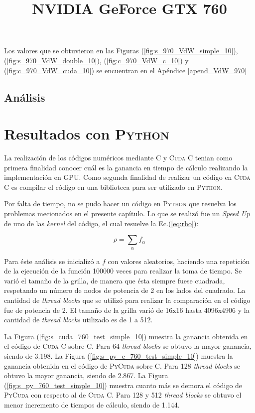 Los valores que se obtuvieron en las Figuras (\ref{fig:s_970_VdW_simple_10}), (\ref{fig:s_970_VdW_double_10}), (\ref{fig:c_970_VdW_c_10}) y (\ref{fig:c_970_VdW_cuda_10}) se encuentran en el Apéndice \ref{apend_VdW_970}

\subsection{Análisis}


\section{Resultados con \textsc{Python}}

La realización de los códigos numéricos mediante \textsc{C} y \textsc{Cuda C} tenian como primera finalidad conocer cuál es la ganancia en tiempo de cálculo realizando la implementación en GPU. Como segunda finalidad de realizar un código en \textsc{Cuda C} es compilar el código en una biblioteca para ser utilizado en \textsc{Python}.

Por falta de tiempo, no se pudo hacer un código en \textsc{Python} que resuelva los problemas mecionados en el presente capítulo. Lo que se realizó fue un \textit{Speed Up} 
de uno de las \textit{kernel} del código, el cual resuelve la Ec.(\ref{eq:rho}):

\begin{equation*}
\rho = \sum_{\alpha} f_{\alpha}
\end{equation*}

Para éste análisis se inicializó a $f$ con valores aleatorios, haciendo una repetición de la ejecución de la función 100000 veces para realizar la toma de tiempo. Se varió el tamaño de la grilla, de manera que ésta siempre fuese cuadrada, respetando un número de nodos de potencia de 2 en los lados del cuadrado. La cantidad de \textit{thread blocks} que se utilizó para realizar la comparación en el código fue de potencia de 2. El tamaño de la grilla varió de 16x16 hasta 4096x4906 y la cantidad de \textit{thread blocks} utilizado es de 1 a 512.


\title{\textbf{NVIDIA GeForce GTX 760}}

La Figura (\ref{fig:s_cuda_760_test_simple_10}) muestra la ganancia obtenida en el código de \textsc{Cuda C} sobre \textsc{C}. Para 64 \textit{thread blocks} se obtuvo la mayor ganancia, siendo de 3.198. La Figura (\ref{fig:s_py_c_760_test_simple_10}) muestra la ganancia obtenida en el código de \textsc{PyCuda} sobre \textsc{C}. Para 128 \textit{thread blocks} se obtuvo la mayor ganancia, siendo de 2.867. La Figura (\ref{fig:s_py_760_test_simple_10}) muestra cuanto más se demora el código de \textsc{PyCuda} con respecto al de \textsc{Cuda C}. Para 128 y 512  \textit{thread blocks} se obtuvo el menor incremento de tiempos de cálculo, siendo de 1.144. 

